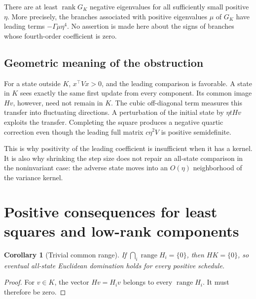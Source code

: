 \documentclass[11pt,letterpaper]{article}
\numberwithin{equation}{section}
\newtheorem{corollary}[theorem]{Corollary}
\theoremstyle{definition}
\newcommand{\rank}{\operatorname{rank}}
\newcommand{\ran}{\operatorname{range}}
\begin{document}
There are at least $\rank G_K$ negative eigenvalues for all sufficiently small positive $\eta$. More precisely, the branches associated with positive eigenvalues $\mu$ of $G_K$ have leading terms $-\Gamma\mu\eta^4$. No assertion is made here about the signs of branches whose fourth-order coefficient is zero.

\subsection{Geometric meaning of the obstruction}

For a state outside $K$, $x^\top Vx>0$, and the leading comparison is favorable. A state in $K$ sees exactly the same first update from every component. Its common image $Hv$, however, need not remain in $K$. The cubic off-diagonal term measures this transfer into fluctuating directions. A perturbation of the initial state by $\eta tHv$ exploits the transfer. Completing the square produces a negative quartic correction even though the leading full matrix $c\eta^2V$ is positive semidefinite.

This is why positivity of the leading coefficient is insufficient when it has a kernel. It is also why shrinking the step size does not repair an all-state comparison in the noninvariant case: the adverse state moves into an $O(\eta)$ neighborhood of the variance kernel.

\section{Positive consequences for least squares and low-rank components}
\label{sec:positive}

\begin{corollary}[Trivial common range]\label{cor:range}
If $\bigcap_i\ran H_i=\{0\}$, then $HK=\{0\}$, so eventual all-state Euclidean domination holds for every positive schedule.
\end{corollary}
\begin{proof}
For $v\in K$, the vector $Hv=H_iv$ belongs to every $\ran H_i$. It must therefore be zero.
\end{proof}
\end{document}
